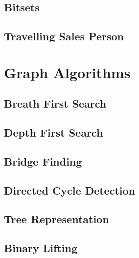 \documentclass[11pt, letterpaper]{article}
\begin{document}
\subsection{Bitsets}


\subsection{Travelling Sales Person}


\section{Graph Algorithms}

\subsection{Breath First Search}


\subsection{Depth First Search}


\subsection{Bridge Finding}


\subsection{Directed Cycle Detection}


\subsection{Tree Representation}


\subsection{Binary Lifting}

\end{document}
